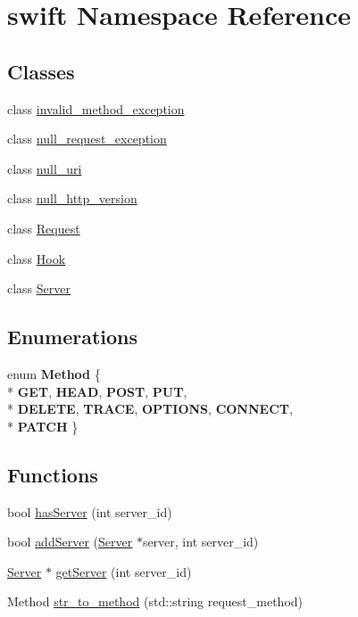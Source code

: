 \hypertarget{namespaceswift}{\section{swift Namespace Reference}
\label{namespaceswift}
}
\subsection*{Classes}
\begin{DoxyCompactItemize}
\item 
class \hyperlink{classswift_1_1invalid__method__exception}{invalid\-\_\-method\-\_\-exception}
\item 
class \hyperlink{classswift_1_1null__request__exception}{null\-\_\-request\-\_\-exception}
\item 
class \hyperlink{classswift_1_1null__uri}{null\-\_\-uri}
\item 
class \hyperlink{classswift_1_1null__http__version}{null\-\_\-http\-\_\-version}
\item 
class \hyperlink{classswift_1_1_request}{Request}
\item 
class \hyperlink{classswift_1_1_hook}{Hook}
\item 
class \hyperlink{classswift_1_1_server}{Server}
\end{DoxyCompactItemize}
\subsection*{Enumerations}
\begin{DoxyCompactItemize}
\item 
enum {\bfseries Method} \{ \\*
{\bfseries G\-E\-T}, 
{\bfseries H\-E\-A\-D}, 
{\bfseries P\-O\-S\-T}, 
{\bfseries P\-U\-T}, 
\\*
{\bfseries D\-E\-L\-E\-T\-E}, 
{\bfseries T\-R\-A\-C\-E}, 
{\bfseries O\-P\-T\-I\-O\-N\-S}, 
{\bfseries C\-O\-N\-N\-E\-C\-T}, 
\\*
{\bfseries P\-A\-T\-C\-H}
 \}
\end{DoxyCompactItemize}
\subsection*{Functions}
\begin{DoxyCompactItemize}
\item 
bool \hyperlink{namespaceswift_a45e07dad5aa2cd143511b697ea48450e}{has\-Server} (int server\-\_\-id)
\item 
bool \hyperlink{namespaceswift_a00edddb9ca464384d01ff658405c8778}{add\-Server} (\hyperlink{classswift_1_1_server}{Server} $\ast$server, int server\-\_\-id)
\item 
\hyperlink{classswift_1_1_server}{Server} $\ast$ \hyperlink{namespaceswift_afb5fcb8e3b86e885e3d0db38d6f5b718}{get\-Server} (int server\-\_\-id)
\item 
Method \hyperlink{namespaceswift_a54d9cafe8eb822e4a2fedef9d724a702}{str\-\_\-to\-\_\-method} (std\-::string request\-\_\-method)
\end{DoxyCompactItemize}
